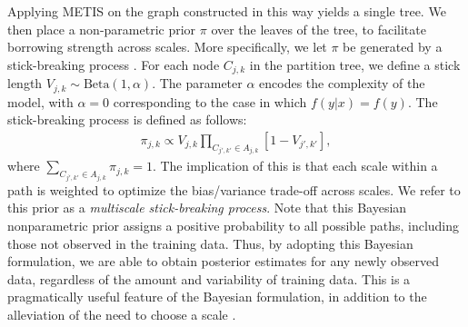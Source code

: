 \documentclass{article} %
\newcommand{\ZZ}{\mathbb{Z}}
\newcommand{\dd}[1]{{\color{blue}{\it #1}}}
\begin{document}
	Applying METIS on the graph constructed in this way yields a single tree.  We then place a non-parametric prior $\pi$ over the leaves of the tree, to facilitate borrowing strength across scales.  More specifically, we let $\pi$ be generated by a stick-breaking process \cite{stickbreaking}.  For each node $C_{j,k}$ in the partition tree, we define a stick length $V_{j,k} \sim \mbox{Beta}(1,\alpha)$.  The parameter $\alpha$ encodes the complexity of the model, with $\alpha=0$ corresponding to the case in which $f(y|x) = f(y)$. The stick-breaking process is defined as follows: 
	\begin{eqnarray}
	\pi_{j,k} \propto V_{j,k} \prod_{C_{j',k'} \in A_{j,k}} \left[1 - V_{j',k'} \right] \label{eq:stick},
	\end{eqnarray}
where  $\sum_{C_{j',k'} \in A_{j,k}} \pi_{j,k} = 1$.  The implication of this is that each scale within a path is weighted to optimize the bias/variance trade-off across scales.  
We refer to this prior as a {\em multiscale stick-breaking process}. Note that this Bayesian nonparametric prior assigns a positive probability to all possible paths, including those not observed in the training data.  Thus, by adopting this Bayesian formulation, we are able to obtain posterior estimates for any newly observed data, regardless of the amount and variability of training data.  This is a pragmatically useful feature of the Bayesian formulation, in addition to the alleviation of the need to choose a scale \cite{ChenMaggioni12}.  %
\end{document}
